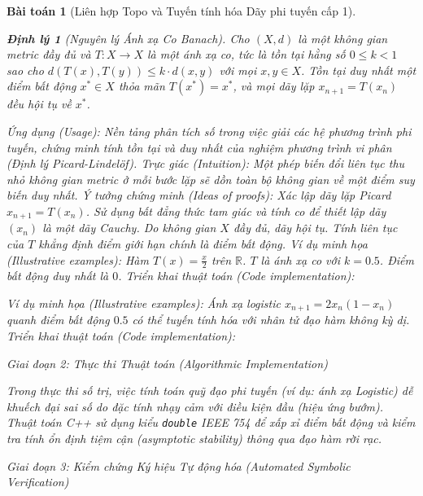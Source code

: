 \documentclass{article}
\newtheorem{baitoan}{Bài toán}
\newtheorem{dinhly}{Định lý}
\begin{document}
\begin{baitoan}[Liên hợp Topo và Tuyến tính hóa Dãy phi tuyến cấp 1]
\begin{dinhly}[Nguyên lý Ánh xạ Co Banach]
Cho $(X, d)$ là một không gian metric đầy đủ và $T: X \to X$ là một ánh xạ co, tức là tồn tại hằng số $0 \le k < 1$ sao cho $d(T(x), T(y)) \le k \cdot d(x, y)$ với mọi $x, y \in X$. Tồn tại duy nhất một điểm bất động $x^* \in X$ thỏa mãn $T(x^*) = x^*$, và mọi dãy lặp $x_{n+1} = T(x_n)$ đều hội tụ về $x^*$.
\end{dinhly}
\emph{Ứng dụng (Usage):} Nền tảng phân tích số trong việc giải các hệ phương trình phi tuyến, chứng minh tính tồn tại và duy nhất của nghiệm phương trình vi phân (Định lý Picard-Lindelöf).
\emph{Trực giác (Intuition):} Một phép biến đổi liên tục thu nhỏ không gian metric ở mỗi bước lặp sẽ dồn toàn bộ không gian về một điểm suy biến duy nhất.
\emph{Ý tưởng chứng minh (Ideas of proofs):} Xác lập dãy lặp Picard $x_{n+1} = T(x_n)$. Sử dụng bất đẳng thức tam giác và tính co để thiết lập dãy $(x_n)$ là một dãy Cauchy. Do không gian $X$ đầy đủ, dãy hội tụ. Tính liên tục của $T$ khẳng định điểm giới hạn chính là điểm bất động.
\emph{Ví dụ minh họa (Illustrative examples):} Hàm $T(x) = \frac{x}{2}$ trên $\mathbb{R}$. $T$ là ánh xạ co với $k = 0.5$. Điểm bất động duy nhất là $0$.
\emph{Triển khai thuật toán (Code implementation):}


\emph{Ví dụ minh họa (Illustrative examples):} Ánh xạ logistic $x_{n+1} = 2x_n(1-x_n)$ quanh điểm bất động $0.5$ có thể tuyến tính hóa với nhân tử đạo hàm không kỳ dị.
\emph{Triển khai thuật toán (Code implementation):}



\vspace{0.5em}\noindent\emph{Giai đoạn 2: Thực thi Thuật toán (Algorithmic Implementation)}
 
 Trong thực thi số trị, việc tính toán quỹ đạo phi tuyến (ví dụ: ánh xạ Logistic) dễ khuếch đại sai số do đặc tính nhạy cảm với điều kiện đầu (hiệu ứng bướm). Thuật toán C++ sử dụng kiểu \texttt{double} IEEE 754 để xấp xỉ điểm bất động và kiểm tra tính ổn định tiệm cận (asymptotic stability) thông qua đạo hàm rời rạc.



\vspace{0.5em}\noindent\emph{Giai đoạn 3: Kiểm chứng Ký hiệu Tự động hóa (Automated Symbolic Verification)}
 

\end{baitoan}
\end{document}
